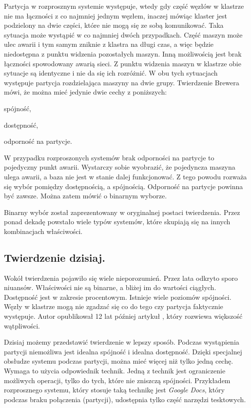 \documentclass[oneside, 11pt, a4paper]{article}
\begin{document}
\begin{multicols}{2}
Partycja w rozprosznym systemie występuje, wtedy gdy część węzłów w klastrze nie ma łączności z co najmniej jednym węzłem, inaczej mówiąc klaster jest podzielony na dwie części, które nie mogą się ze sobą komunikować. Taka sytuacja może wystąpić w co najmniej dwóch przypadkach. Część maszyn może ulec awarii i tym samym zniknie z klastra na długi czas, a więc będzie niedostępna z punktu widzenia pozostałych maszyn. Inną możliwością jest brak łączności spowodowany awarią sieci. Z punktu widzenia maszyn w klastrze obie sytuacje są identyczne i nie da się ich rozróżnić. W obu tych sytuacjach występuje partycja rozdzielająca maszyny na dwie grupy.
 Twierdzenie Brewera mówi, że można mieć jedynie dwie cechy z poniższych:
\begin{compactitem}
  \item spójność,
  \item dostępność,
  \item odporność na partycje.
\end{compactitem}

W przypadku rozproszonych systemów brak odporności na partycje to pojedyczny punkt awarii. Wystarczy sobie wyobrazić, że pojedyncza maszyna ulega awarii, a baza nie jest w stanie dalej funkcjonować. Z tego powodu rozważa się wybór pomiędzy dostępnością, a spójnością. Odporność na partycje powinna być zawsze. Można zatem mówić o binarnym wyborze.

Binarny wybór został zaprezentowany w oryginalnej postaci twierdzenia. Przez ponad dekadę powstało wiele typów systemów, które skupiają się na innych kombinacjach właściwości. 
\subsection{Twierdzenie dzisiaj.} Wokół twierdzenia pojawiło się wiele nieporozumień. Przez lata odkryto sporo niuansów. Właściwości nie są binarne, a bliżej im do wartości ciągłych. Dostępność jest w zakresie procentowym. Istnieje wiele poziomów spójności. Węzły w klastrze mogą nie zgadzać się co do tego czy partycja faktycznie występuje. Autor opublikował 12 lat później artykuł \cite{Brewer:2012ba}, który rozwiewa większość wątpliwości.

Dzisiaj możemy przedstawić twierdzenie w lepszy sposób. Podczas wystąpienia partycji niemożliwa jest idealna spójność i idealna dostępność. Dzięki specjalnej obsłudze systemu podczas partycji, można mieć więcej niż tylko jedną cechę. Wymaga to użycia odpowiednik technik. Jedną z technik jest ograniczenie możliwych operacji, tylko do tych, które nie zniszczą spójności. Przykładem rozprosznego systemu, który stosuje taką technikę jest \emph{Google Docs}, który podczas braku połączenia (partycji), udostępnia tylko część narzędzi tesktowych. 


\end{multicols}
\end{document}

